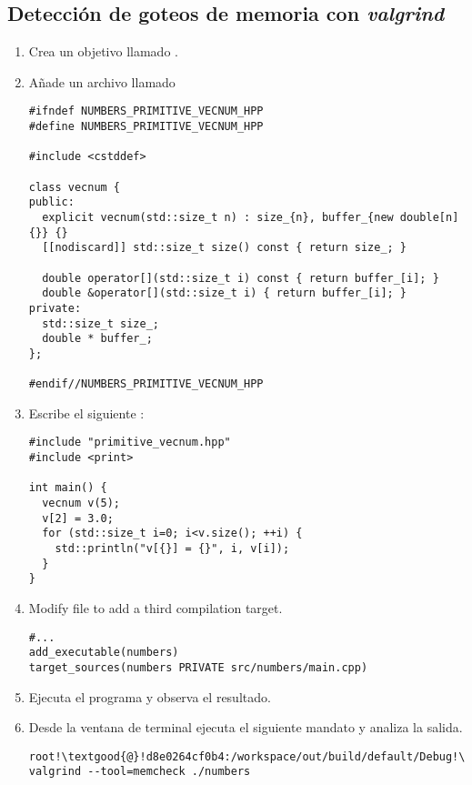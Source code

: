 \subsection{Detección de goteos de memoria con \emph{valgrind}}

\begin{enumerate}

\item
Crea un objetivo llamado .

\item Añade un archivo llamado 

\begin{lstlisting}
#ifndef NUMBERS_PRIMITIVE_VECNUM_HPP
#define NUMBERS_PRIMITIVE_VECNUM_HPP

#include <cstddef>

class vecnum {
public:
  explicit vecnum(std::size_t n) : size_{n}, buffer_{new double[n]{}} {}
  [[nodiscard]] std::size_t size() const { return size_; }

  double operator[](std::size_t i) const { return buffer_[i]; }
  double &operator[](std::size_t i) { return buffer_[i]; }
private:
  std::size_t size_;
  double * buffer_;
};

#endif//NUMBERS_PRIMITIVE_VECNUM_HPP
\end{lstlisting}

\item
Escribe el siguiente :

\begin{lstlisting}
#include "primitive_vecnum.hpp"
#include <print>

int main() {
  vecnum v(5);
  v[2] = 3.0;
  for (std::size_t i=0; i<v.size(); ++i) {
    std::println("v[{}] = {}", i, v[i]);
  }
}
\end{lstlisting}

\item Modify file  to add a third compilation target.

\begin{lstlisting}
#...
add_executable(numbers)
target_sources(numbers PRIVATE src/numbers/main.cpp)
\end{lstlisting}

\item
Ejecuta el programa y observa el resultado.

\item
Desde la ventana de terminal ejecuta el siguiente mandato y analiza la salida.

\begin{lstlisting}[style=terminal,escapechar=!]
root!\textgood{@}!d8e0264cf0b4:/workspace/out/build/default/Debug!\textgood{\#}! valgrind --tool=memcheck ./numbers
\end{lstlisting}

\end{enumerate}
